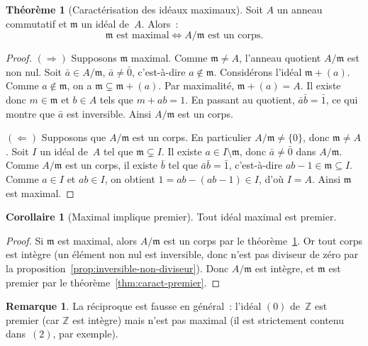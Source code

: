 \documentclass[12pt,a4paper,openany]{book}
\theoremstyle{definition}
\newtheorem{theoreme}{Théorème}[chapter]
\newtheorem{corollaire}{Corollaire}[chapter]
\newtheorem{remarque}{Remarque}[chapter]
\newcommand{\Z}{\mathbb{Z}}
\begin{document}
\begin{theoreme}[Caractérisation des idéaux maximaux]%
\label{thm:caract-maximal}
Soit $A$ un anneau commutatif et $\mathfrak{m}$ un idéal de~$A$.
Alors~:
\[
  \mathfrak{m} \text{ est maximal}
  \iff
  A/\mathfrak{m} \text{ est un corps}.
\]
\end{theoreme}

\begin{proof}
$(\Rightarrow)$\; Supposons $\mathfrak{m}$ maximal. Comme
$\mathfrak{m} \neq A$, l'anneau quotient $A/\mathfrak{m}$ est non nul.
Soit $\bar{a} \in A/\mathfrak{m}$, $\bar{a} \neq \bar{0}$, c'est-à-dire
$a \notin \mathfrak{m}$. Considérons l'idéal $\mathfrak{m} + (a)$.
Comme $a \notin \mathfrak{m}$, on a
$\mathfrak{m} \subsetneq \mathfrak{m} + (a)$. Par maximalité,
$\mathfrak{m} + (a) = A$. Il existe donc $m \in \mathfrak{m}$ et $b \in A$
tels que $m + ab = 1$. En passant au quotient, $\bar{a}\bar{b} = \bar{1}$,
ce qui montre que $\bar{a}$ est inversible. Ainsi $A/\mathfrak{m}$ est
un corps.

$(\Leftarrow)$\; Supposons que $A/\mathfrak{m}$ est un corps. En
particulier $A/\mathfrak{m} \neq \{0\}$, donc $\mathfrak{m} \neq A$.
Soit $I$ un idéal de~$A$ tel que $\mathfrak{m} \subsetneq I$. Il existe
$a \in I \setminus \mathfrak{m}$, donc $\bar{a} \neq \bar{0}$ dans
$A/\mathfrak{m}$. Comme $A/\mathfrak{m}$ est un corps, il existe
$\bar{b}$ tel que $\bar{a}\bar{b} = \bar{1}$, c'est-à-dire
$ab - 1 \in \mathfrak{m} \subseteq I$. Comme $a \in I$ et $ab \in I$,
on obtient $1 = ab - (ab - 1) \in I$, d'où $I = A$. Ainsi $\mathfrak{m}$
est maximal.
\end{proof}

\begin{corollaire}[Maximal implique premier]\label{cor:maximal-premier}
Tout idéal maximal est premier.
\end{corollaire}

\begin{proof}
Si $\mathfrak{m}$ est maximal, alors $A/\mathfrak{m}$ est un corps par
le théorème~\ref{thm:caract-maximal}. Or tout corps est intègre (un
élément non nul est inversible, donc n'est pas diviseur de zéro par la
proposition~\ref{prop:inversible-non-diviseur}). Donc $A/\mathfrak{m}$
est intègre, et $\mathfrak{m}$ est premier par le
théorème~\ref{thm:caract-premier}.
\end{proof}

\begin{remarque}\label{rem:premier-pas-maximal}
La réciproque est fausse en général~: l'idéal $(0)$ de~$\Z$ est premier
(car $\Z$ est intègre) mais n'est pas maximal (il est strictement contenu
dans~$(2)$, par exemple).
\end{remarque}
\end{document}
